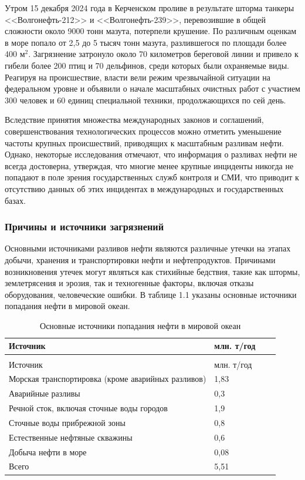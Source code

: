 Утром 15 декабря 2024 года в Керченском проливе в результате шторма танкеры <<Волгонефть-212>> и <<Волгонефть-239>>, перевозившие в общей сложности около 9000 тонн мазута, потерпели крушение. По различным оценкам в море попало от 2,5 до 5 тысяч тонн мазута, разлившегося по площади более 400 м$^{2} $. Загрязнение затронуло около 70 километров береговой линии и привело к гибели более 200 птиц и 70 дельфинов, среди которых были охраняемые виды. Реагируя на происшествие, власти вели режим чрезвычайной ситуации на федеральном уровне и объявили о начале масштабных очистных работ с участием 300 человек и 60 единиц специальной техники, продолжающихся по сей день.

Вследствие принятия множества международных законов и соглашений, совершенствования технологических процессов можно отметить уменьшение частоты крупных происшествий, приводящих к масштабным разливам нефти. Однако, некоторые исследования\cite{spill_db} отмечают, что информация о разливах нефти не всегда достоверна, утверждая, что многие менее крупные инциденты никогда не попадают в поле зрения государственных служб контроля и СМИ, что приводит к отсутствию данных об этих инцидентах в международных и государственных базах. 

\subsubsection{Причины и источники загрязнений}
Основными источниками разливов нефти являются различные утечки на этапах добычи, хранения и транспортировки нефти и нефтепродуктов. Причинами возникновения утечек могут являться как стихийные бедствия, такие как штормы, землетрясения и эрозия, так и техногенные факторы, включая отказы оборудования, человеческие ошибки.  В таблице 1.1 указаны основные источники попадания нефти в мировой океан\cite{spill_reasons}.

\begin{xltabular}{\textwidth}{|l|l|p{3.2cm}|X|}
	\caption{Основные источники попадания нефти в мировой океан\label{oil_source:table}}\\ \hline
	Источник & млн. т/год \\ \hline
	\endfirsthead
	\\ \hline
	Источник & млн. т/год \\ \hline
	\endhead
	Морская транспортировка (кроме аварийных разливов) & 1,83 \\ \hline
	Аварийные разливы & 0,3 \\ \hline
	Речной сток, включая сточные воды городов & 1,9 \\ \hline
	Сточные воды прибрежной зоны & 0,8 \\ \hline
	Естественные нефтяные скважины & 0,6 \\ \hline
	Добыча нефти в море & 0,08 \\ \hline
	Всего & 5,51 \\ \hline
\end{xltabular}

